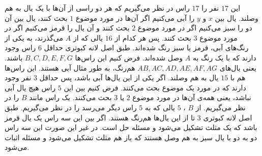 \p
این
$17$
نفر را
$17$
راس در نظر می‌گیریم که هر دو راسی از آن‌ها با یک یال به هم وصلند. یال بین
$x$
و
$y$
را آبی می‌کنیم اگر آن‌ها در مورد موضوع
$1$
بحث کنند، یال بین آن دو را سبز می‌کنیم اگر در مورد موضوع
$2$
بحث کنند و آن یال را قرمز می‌کنیم اگر در مورد موضوع
$3$
بحث کنند. پس هر کدام از
$16$
یالی که از
$A$
می‌گذرند، به یکی از رنگ‌های آبی، قرمز یا سبز رنگ شده‌اند. طبق اصل لانه کبوتری حداقل
$6$
راس وجود دارند که با یک رنگ به
$A$
وصل شده‌اند. فرض کنیم این راس‌ها
$B, C, D, E, F, G$
باشند. یعنی یال‌های
$AB, AC, AD, AE, AF, AG$
هم‌رنگ، به طور مثال آبی هستند. این راس‌ها هم با
$15$
یال به هم وصلند. اگر یکی از این یال‌ها آبی باشد، پس حداقل
$3$
نفر وجود دارند که در مورد یک موضوع بحث می‌کنند. فرض کنیم بین این
$5$
راس هیچ یال آبی نباشد، یعنی همه‌ی آن‌ها در مورد موضوع
$2$
یا
$3$
بحث می‌کنند. یک راس مانند
$B$
را در نظر می‌گیریم. از
$B$
،
$5$
یالی که به
$5$
راس دیگر می‌رسد را در نظر می‌گیریم. طبق اصل لانه کبوتری
$3$
تا از این یال‌ها هم‌رنگ هستند. اگر بین این سه راس یک یال قرمز باشد که یک مثلث تشکیل می‌شود و مسئله حل است. در غیر این صورت این سه راس دو به دو با یال سبز به هم وصل هستند که باز هم مثلث تشکیل می‌شود و مسئله اثبات می‌شود.